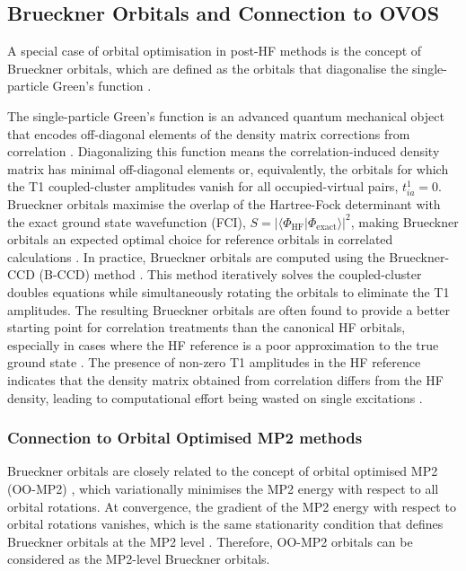 \subsection{Brueckner Orbitals and Connection to OVOS}
\label{subsec:brueckner_background}

A special case of orbital optimisation in post-HF methods is the concept of Brueckner orbitals, which are defined as the orbitals that diagonalise the single-particle Green's function \cite{Brueckner1954}.

The single-particle Green's function is an advanced quantum mechanical object that encodes off-diagonal elements of the density matrix corrections from correlation \cite{Helgaker2000}. Diagonalizing this function means the correlation-induced density matrix has minimal off-diagonal elements or, equivalently, the orbitals for which the T1 coupled-cluster amplitudes vanish for all occupied-virtual pairs, $t_{ia}^{1} = 0$. Brueckner orbitals maximise the overlap of the Hartree-Fock determinant with the exact ground state wavefunction (FCI), $S = |\langle \Phi_{\text{HF}} | \Phi_{\text{exact}} \rangle|^2$, making Brueckner orbitals an expected optimal choice for reference orbitals in correlated calculations \cite{Handy1989}. In practice, Brueckner orbitals are computed using the Brueckner-CCD (B-CCD) method \cite{Handy1989}. This method iteratively solves the coupled-cluster doubles equations while simultaneously rotating the orbitals to eliminate the T1 amplitudes. The resulting Brueckner orbitals are often found to provide a better starting point for correlation treatments than the canonical HF orbitals, especially in cases where the HF reference is a poor approximation to the true ground state \cite{Purvis1982, Handy1989}. The presence of non-zero T1 amplitudes in the HF reference indicates that the density matrix obtained from correlation differs from the HF density, leading to computational effort being wasted on single excitations \cite{Lee2018}.

\subsubsection{Connection to Orbital Optimised MP2 methods}

Brueckner orbitals are closely related to the concept of orbital optimised MP2 (OO-MP2) \cite{Lee2018}, which variationally minimises the MP2 energy with respect to all orbital rotations. At convergence, the gradient of the MP2 energy with respect to orbital rotations vanishes, which is the same stationarity condition that defines Brueckner orbitals at the MP2 level \cite{Lee2018}. Therefore, OO-MP2 orbitals can be considered as the MP2-level Brueckner orbitals.

